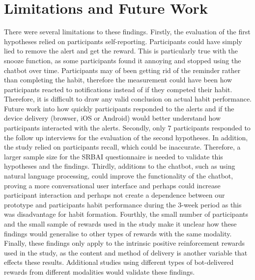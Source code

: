 
\section{Limitations and Future Work} \label{limitations_and_future_work}
There were several limitations to these findings. Firstly, the evaluation of the first hypotheses relied on participants self-reporting. Participants could have simply lied to remove the alert and get the reward. This is particularly true with the snooze function, as some participants found it annoying and stopped using the chatbot over time. Participants may of been getting rid of the reminder rather than completing the habit, therefore the measurement could have been how participants reacted to notifications instead of if they competed their habit. Therefore, it is difficult to draw any valid conclusion on actual habit performance. Future work into how quickly participants responded to the alerts and if the device delivery (browser, iOS or Android) would better understand how participants interacted with the alerts. Secondly, only 7 participants responded to the follow up interviews for the evaluation of the second hypotheses. In addition, the study relied on participants recall, which could be inaccurate. Therefore, a larger sample size for the SRBAI questionnaire is needed to validate this hypotheses and the findings. Thirdly, additions to the chatbot, such as using natural language processing, could improve the functionality of the chatbot, proving a more conversational user interface and perhaps could increase participant interaction and perhaps not create a dependence between our prototype and participants habit performance during the 3-week period as this was disadvantage for habit formation. Fourthly, the small number of participants and the small sample of rewards used in the study make it unclear how these findings would generalise to other types of rewards with the same modality. Finally, these findings only apply to the intrinsic positive reinforcement rewards used in the study, as the content and method of delivery is another variable that effects these results. Additional studies using different types of bot-delivered rewards from different modalities would validate these findings.

\newpage

